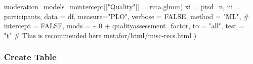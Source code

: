 \documentclass[
  letterpaper,
  DIV=11,
  numbers=noendperiod]{scrartcl}
\newenvironment{Shaded}{\begin{snugshade}}{\end{snugshade}}
\newcommand{\AttributeTok}[1]{\textcolor[rgb]{0.40,0.45,0.13}{#1}}
\newcommand{\CommentTok}[1]{\textcolor[rgb]{0.37,0.37,0.37}{#1}}
\newcommand{\ConstantTok}[1]{\textcolor[rgb]{0.56,0.35,0.01}{#1}}
\newcommand{\DecValTok}[1]{\textcolor[rgb]{0.68,0.00,0.00}{#1}}
\newcommand{\FunctionTok}[1]{\textcolor[rgb]{0.28,0.35,0.67}{#1}}
\newcommand{\NormalTok}[1]{\textcolor[rgb]{0.00,0.23,0.31}{#1}}
\newcommand{\OtherTok}[1]{\textcolor[rgb]{0.00,0.23,0.31}{#1}}
\newcommand{\SpecialCharTok}[1]{\textcolor[rgb]{0.37,0.37,0.37}{#1}}
\newcommand{\StringTok}[1]{\textcolor[rgb]{0.13,0.47,0.30}{#1}}
\begin{document}
\begin{Shaded}
\begin{Highlighting}[]
\NormalTok{moderation\_models\_nointercept[[}\StringTok{"Quality"}\NormalTok{]] }\OtherTok{=} \FunctionTok{rma.glmm}\NormalTok{(}
  \AttributeTok{xi =} \StringTok{\textasciigrave{}}\AttributeTok{ptsd\_n}\StringTok{\textasciigrave{}}\NormalTok{, }
  \AttributeTok{ni =} \StringTok{\textasciigrave{}}\AttributeTok{participants}\StringTok{\textasciigrave{}}\NormalTok{, }
  \AttributeTok{data =}\NormalTok{ df, }
  \AttributeTok{measure=}\StringTok{"PLO"}\NormalTok{,}
  \AttributeTok{verbose =} \ConstantTok{FALSE}\NormalTok{,}
  \AttributeTok{method =} \StringTok{"ML"}\NormalTok{,}
  \CommentTok{\# intercept = FALSE,}
  \AttributeTok{mods =} \SpecialCharTok{\textasciitilde{}} \DecValTok{0} \SpecialCharTok{+}\NormalTok{ qualityassessment\_factor,}
  \AttributeTok{to =} \StringTok{"all"}\NormalTok{,}
  \AttributeTok{test =} \StringTok{"t"} \CommentTok{\# This is recommended here metafor/html/misc{-}recs.html}
\NormalTok{)}
\end{Highlighting}
\end{Shaded}

\subsubsection{Create Table}\label{create-table}
\end{document}
